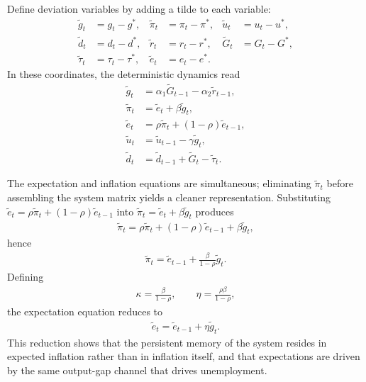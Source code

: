 \documentclass[11pt]{article}
\begin{document}
Define deviation variables by adding a tilde to each variable:
\begin{align*}
    \tilde g_t &= g_t-g^*, &
    \tilde \pi_t &= \pi_t-\pi^*, &
    \tilde u_t &= u_t-u^*, \\
    \tilde d_t &= d_t-d^*, &
    \tilde r_t &= r_t-r^*, &
    \tilde G_t &= G_t-G^*, \\
    \tilde \tau_t &= \tau_t-\tau^*, &
    \tilde e_t &= e_t-e^*.
\end{align*}
In these coordinates, the deterministic dynamics read
\begin{align*}
    \tilde g_t &= \alpha_1\tilde G_{t-1}-\alpha_2\tilde r_{t-1}, \\
    \tilde \pi_t &= \tilde e_t+\beta\tilde g_t, \\
    \tilde e_t &= \rho\tilde \pi_t+(1-\rho)\tilde e_{t-1}, \\
    \tilde u_t &= \tilde u_{t-1}-\gamma\tilde g_t, \\
    \tilde d_t &= \tilde d_{t-1}+\tilde G_t-\tilde \tau_t.
\end{align*}

The expectation and inflation equations are simultaneous; eliminating $\tilde \pi_t$ before assembling the system matrix yields a cleaner representation. Substituting $\tilde e_t=\rho\tilde \pi_t+(1-\rho)\tilde e_{t-1}$ into $\tilde \pi_t=\tilde e_t+\beta\tilde g_t$ produces
\begin{align*}
    \tilde \pi_t = \rho\tilde \pi_t+(1-\rho)\tilde e_{t-1}+\beta\tilde g_t,
\end{align*}
hence
\begin{align*}
    \tilde \pi_t = \tilde e_{t-1} + \frac{\beta}{1-\rho}\tilde g_t.
\end{align*}
Defining
\begin{align*}
    \kappa = \frac{\beta}{1-\rho},
    \qquad
    \eta = \frac{\rho\beta}{1-\rho},
\end{align*}
the expectation equation reduces to
\begin{align*}
    \tilde e_t = \tilde e_{t-1}+\eta\tilde g_t.
\end{align*}
This reduction shows that the persistent memory of the system resides in expected inflation rather than in inflation itself, and that expectations are driven by the same output-gap channel that drives unemployment.
\end{document}
